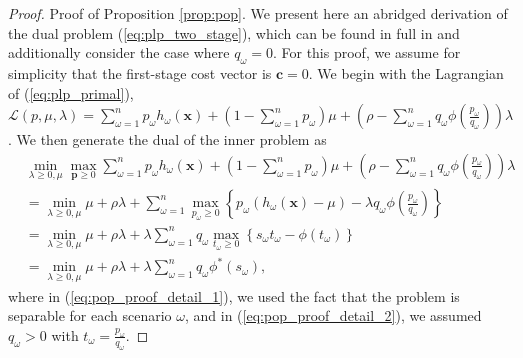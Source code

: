 \documentclass[opre,nonblindrev]{informs3} %
\newcommand{\x}{\mathbf{x}}
\renewcommand{\c}{\mathbf{c}}
\newcommand{\p}{\mathbf{p}}
\begin{document}
\begin{proof}{\sc Proof of Proposition \ref{prop:pop}.}
	We present here an abridged derivation of the dual problem (\ref{eq:plp_two_stage}), which can be found in full in \citep{bental2011robust} and additionally consider the case where $q_\omega = 0$.
	For this proof, we assume for simplicity that the first-stage cost vector is $\c = 0$.	
	We begin with the Lagrangian of (\ref{eq:plp_primal}), $\mathcal{L}(p,\mu,\lambda) = \sum_{\omega=1}^n p_\omega h_\omega(\x) + \left( 1-\sum_{\omega=1}^n p_\omega \right)\mu + \left( \rho - \sum_{\omega=1}^n q_\omega \phi\left(\frac{p_\omega}{q_\omega}\right) \right)\lambda$. 
We then generate the dual of the inner problem as
	\begin{align}
		 & \min_{\lambda \geq 0, \mu} \max_{\p \geq 0} \sum_{\omega=1}^n p_\omega h_\omega(\x) + \left( 1-\sum_{\omega=1}^n p_\omega \right)\mu + \left( \rho - \sum_{\omega=1}^n q_\omega \phi\left(\frac{p_\omega}{q_\omega}\right) \right)\lambda \nonumber \\
		& = \min_{\lambda \geq 0, \mu} \mu + \rho\lambda + \sum_{\omega=1}^n \max_{p_\omega \geq 0} \left\{ p_\omega (h_\omega(\x) - \mu) - \lambda q_\omega \phi\left(\frac{p_\omega}{q_\omega}\right) \right\} \label{eq:pop_proof_detail_1} \\
		& =  \min_{\lambda \geq 0, \mu} \mu + \rho\lambda + \lambda \sum_{\omega=1}^n q_\omega \max_{t_\omega \geq 0} \left\{ s_\omega t_\omega - \phi(t_\omega) \right\} \label{eq:pop_proof_detail_2} \\
		& = \min_{\lambda \geq 0, \mu} \mu + \rho\lambda + \lambda \sum_{\omega=1}^n q_\omega \phi^*\left(s_\omega\right), \nonumber
	\end{align}
	where in (\ref{eq:pop_proof_detail_1}), we used the fact that the problem is separable for each scenario $\omega$, and in (\ref{eq:pop_proof_detail_2}), we assumed $q_\omega > 0$ with $t_\omega = \frac{p_\omega}{q_\omega}$.
	

\end{proof}
\end{document}
